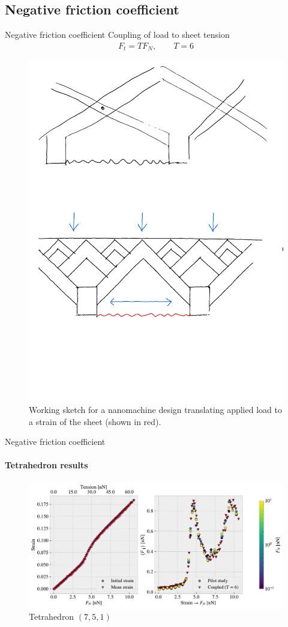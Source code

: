 \documentclass[
	10pt, %
]{beamer}
\begin{document}
\subsection{Negative friction coefficient}
\begin{frame}{Negative friction coefficient}
	Coupling of load to sheet tension 
	\begin{align*}
		F_t = TF_N, \qquad T = 6
	\end{align*}
	\begin{figure}[H]
		\centering
		\includegraphics[width=0.6\linewidth]{../thesis/figures/negative_coefficient/nanomachine.pdf}
		\caption{Working sketch for a nanomachine design translating applied load to a strain of the sheet (shown in red).}
		\label{fig:nanomachine}
	\end{figure}	  
\end{frame}
%
%
\begin{frame}{Negative friction coefficient}
	\framesubtitle{Tetrahedron results}
	
	\begin{figure}[H]
		\centering
		\includegraphics[width=\linewidth]{../thesis/figures/negative_coefficient/manual_coupling_tension_pop7_5_1.pdf}	
		\caption{Tetrahedron $(7,5,1)$}
	\end{figure}	
\end{frame}
%
%
\end{document}
